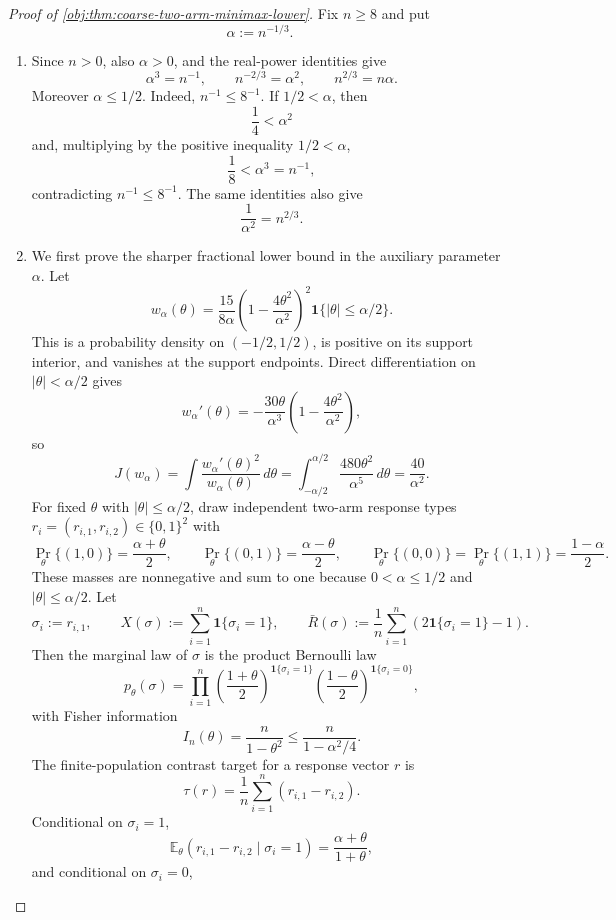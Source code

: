 \begin{proof}[Proof of \cref{obj:thm:coarse-two-arm-minimax-lower}]
Fix \(n\ge 8\) and put
\[
\alpha:=n^{-1/3}.
\]
\begin{enumerate}
\item Since \(n>0\), also \(\alpha>0\), and the real-power identities give
\[
\alpha^3=n^{-1},\qquad
n^{-2/3}=\alpha^2,\qquad
n^{2/3}=n\alpha .
\]
Moreover \(\alpha\le 1/2\). Indeed, \(n^{-1}\le 8^{-1}\). If \(1/2<\alpha\), then
\[
\frac14<\alpha^2
\]
and, multiplying by the positive inequality \(1/2<\alpha\),
\[
\frac18<\alpha^3=n^{-1},
\]
contradicting \(n^{-1}\le 8^{-1}\). The same identities also give
\[
\frac1{\alpha^2}=n^{2/3}.
\]

\item We first prove the sharper fractional lower bound in the auxiliary parameter \(\alpha\). Let
\[
w_\alpha(\theta)
=
\frac{15}{8\alpha}
\left(1-\frac{4\theta^2}{\alpha^2}\right)^2
\mathbf 1\{|\theta|\le \alpha/2\}.
\]
This is a probability density on \((-1/2,1/2)\), is positive on its support interior, and vanishes at the support endpoints. Direct differentiation on \(|\theta|<\alpha/2\) gives
\[
w_\alpha'(\theta)
=
-\frac{30\theta}{\alpha^3}
\left(1-\frac{4\theta^2}{\alpha^2}\right),
\]
so
\[
J(w_\alpha)
=
\int \frac{w_\alpha'(\theta)^2}{w_\alpha(\theta)}\,d\theta
=
\int_{-\alpha/2}^{\alpha/2}\frac{480\theta^2}{\alpha^5}\,d\theta
=
\frac{40}{\alpha^2}.
\]
For fixed \(\theta\) with \(|\theta|\le \alpha/2\), draw independent two-arm response types \(r_i=(r_{i,1},r_{i,2})\in\{0,1\}^2\) with
\[
\Pr_\theta\{(1,0)\}=\frac{\alpha+\theta}{2},\qquad
\Pr_\theta\{(0,1)\}=\frac{\alpha-\theta}{2},\qquad
\Pr_\theta\{(0,0)\}=\Pr_\theta\{(1,1)\}=\frac{1-\alpha}{2}.
\]
These masses are nonnegative and sum to one because \(0<\alpha\le 1/2\) and \(|\theta|\le \alpha/2\). Let
\[
\sigma_i:=r_{i,1},\qquad
X(\sigma):=\sum_{i=1}^n \mathbf 1\{\sigma_i=1\},\qquad
\bar R(\sigma):=\frac1n\sum_{i=1}^n(2\mathbf 1\{\sigma_i=1\}-1).
\]
Then the marginal law of \(\sigma\) is the product Bernoulli law
\[
p_\theta(\sigma)
=
\prod_{i=1}^n
\left(\frac{1+\theta}{2}\right)^{\mathbf 1\{\sigma_i=1\}}
\left(\frac{1-\theta}{2}\right)^{\mathbf 1\{\sigma_i=0\}},
\]
with Fisher information
\[
I_n(\theta)=\frac{n}{1-\theta^2}
\le
\frac{n}{1-\alpha^2/4}.
\]
The finite-population contrast target for a response vector \(r\) is
\[
\tau(r)=\frac1n\sum_{i=1}^n(r_{i,1}-r_{i,2}).
\]
Conditional on \(\sigma_i=1\),
\[
\mathbb E_\theta(r_{i,1}-r_{i,2}\mid \sigma_i=1)=\frac{\alpha+\theta}{1+\theta},
\]
and conditional on \(\sigma_i=0\),

\end{enumerate}
\end{proof}
